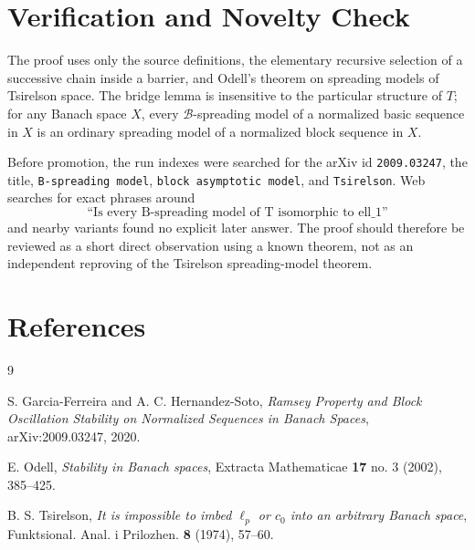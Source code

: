 \documentclass[11pt]{article}
\newcommand{\cB}{\mathcal B}
\begin{document}
\section*{Verification and Novelty Check}

The proof uses only the source definitions, the elementary recursive
selection of a successive chain inside a barrier, and Odell's theorem on
spreading models of Tsirelson space. The bridge lemma is insensitive to the
particular structure of $T$; for any Banach space $X$, every
$\cB$-spreading model of a normalized basic sequence in $X$ is an ordinary
spreading model of a normalized block sequence in $X$.

Before promotion, the run indexes were searched for the arXiv id
\texttt{2009.03247}, the title, \texttt{B-spreading model},
\texttt{block asymptotic model}, and \texttt{Tsirelson}. Web searches for
exact phrases around
\[
  \text{``Is every B-spreading model of T isomorphic to ell\_1''}
\]
and nearby variants found no explicit later answer. The proof should
therefore be reviewed as a short direct observation using a known theorem,
not as an independent reproving of the Tsirelson spreading-model theorem.

\section*{References}

\begin{thebibliography}{9}

S. Garcia-Ferreira and A. C. Hernandez-Soto,
\emph{Ramsey Property and Block Oscillation Stability on Normalized
Sequences in Banach Spaces}, arXiv:2009.03247, 2020.

E. Odell,
\emph{Stability in Banach spaces},
Extracta Mathematicae \textbf{17} no. 3 (2002), 385--425.

B. S. Tsirelson,
\emph{It is impossible to imbed $\ell_p$ or $c_0$ into an arbitrary Banach
space},
Funktsional. Anal. i Prilozhen. \textbf{8} (1974), 57--60.

\end{thebibliography}
\end{document}
